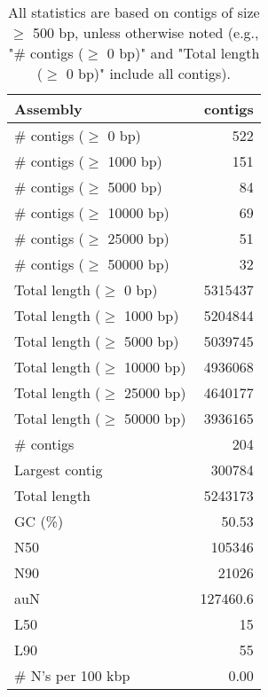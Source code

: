 \documentclass[12pt,a4paper]{article}
\begin{document}
\begin{table}[ht]
\begin{center}
\caption{All statistics are based on contigs of size $\geq$ 500 bp, unless otherwise noted (e.g., "\# contigs ($\geq$ 0 bp)" and "Total length ($\geq$ 0 bp)" include all contigs).}
\begin{tabular}{|l*{1}{|r}|}
\hline
Assembly & contigs \\ \hline
\# contigs ($\geq$ 0 bp) & 522 \\ \hline
\# contigs ($\geq$ 1000 bp) & 151 \\ \hline
\# contigs ($\geq$ 5000 bp) & 84 \\ \hline
\# contigs ($\geq$ 10000 bp) & 69 \\ \hline
\# contigs ($\geq$ 25000 bp) & 51 \\ \hline
\# contigs ($\geq$ 50000 bp) & 32 \\ \hline
Total length ($\geq$ 0 bp) & 5315437 \\ \hline
Total length ($\geq$ 1000 bp) & 5204844 \\ \hline
Total length ($\geq$ 5000 bp) & 5039745 \\ \hline
Total length ($\geq$ 10000 bp) & 4936068 \\ \hline
Total length ($\geq$ 25000 bp) & 4640177 \\ \hline
Total length ($\geq$ 50000 bp) & 3936165 \\ \hline
\# contigs & 204 \\ \hline
Largest contig & 300784 \\ \hline
Total length & 5243173 \\ \hline
GC (\%) & 50.53 \\ \hline
N50 & 105346 \\ \hline
N90 & 21026 \\ \hline
auN & 127460.6 \\ \hline
L50 & 15 \\ \hline
L90 & 55 \\ \hline
\# N's per 100 kbp & 0.00 \\ \hline
\end{tabular}
\end{center}
\end{table}
\end{document}
